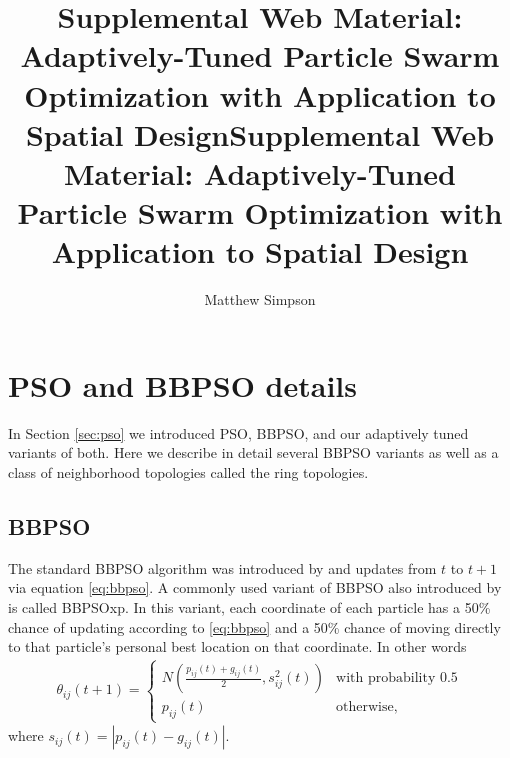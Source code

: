 \documentclass[cmbright]{staauth}
\begin{document}
\blind
{
  \title{Supplemental Web Material: Adaptively-Tuned Particle Swarm Optimization with Application to Spatial Design}
  \author{Matthew Simpson}
  \address{Department of Statistics, University of Missouri,\\
    146 Middlebush Hall, Columbia, MO 65211-6100}
  \received{}
  \accepted{}

}\fi
{}\blind
{
  \title{Supplemental Web Material: Adaptively-Tuned Particle Swarm Optimization with Application to Spatial Design}
  \author{}
  \address{}
  \corremail{}
  \received{}
  \accepted{}

}\fi

\maketitle

\appendix
\section{PSO and BBPSO details}\label{app:psodetail}

In Section \ref{sec:pso} we introduced PSO, BBPSO, and our adaptively tuned variants of both. Here we describe in detail several BBPSO variants as well as a class of neighborhood topologies called the ring topologies.

\subsection{BBPSO}\label{subapp:bbpso}
The standard BBPSO algorithm was introduced by \citet{kennedy2003bare} and updates from $t$ to $t+1$ via equation \eqref{eq:bbpso}. A commonly used variant of BBPSO also introduced by \citet{kennedy2003bare} is called BBPSOxp. In this variant, each coordinate of each particle has a 50\% chance of updating according to \eqref{eq:bbpso} and a 50\% chance of moving directly to that particle's personal best location on that coordinate. In other words
\begin{align}\label{eq:bbpsoxp}
\theta_{ij}(t+1) = \begin{cases} N\left(\frac{p_{ij}(t) + g_{ij}(t)}{2}, s^2_{ij}(t)\right) & \mbox{with probability }0.5\\
p_{ij}(t) &\mbox{otherwise,}\end{cases}
\end{align}
where $s_{ij}(t) = |p_{ij}(t) - g_{ij}(t)|$.
\end{document}
